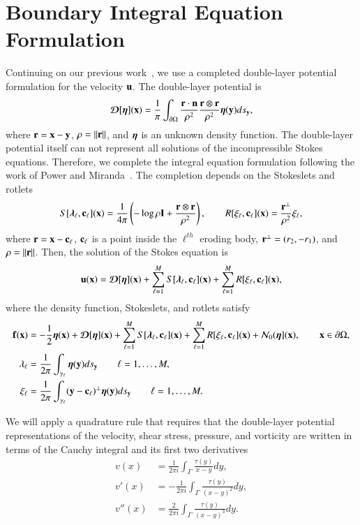 \documentclass[preprint, 10pt]{elsarticle}
\begin{document}
\section{Boundary Integral Equation Formulation}
\label{s:formulation}
Continuing on our previous work~\cite{qua-moo2018}, we use a completed
double-layer potential formulation for the velocity ${\mathbf{u}}$.  The
double-layer potential is
\begin{align}
  {\boldsymbol{\mathcal D}}[{\boldsymbol\eta}]({\mathbf{x}}) = \frac{1}{\pi}\int_{{\partial}\Omega} 
    \frac{{\mathbf{r}} \cdot {\mathbf{n}}}{\rho^2} \frac{{\mathbf{r}} \otimes {\mathbf{r}}}{\rho^2}
    {\boldsymbol\eta}({\mathbf{y}}) ds_{\mathbf{y}},
\end{align}
where ${\mathbf{r}} = {\mathbf{x}} - {\mathbf{y}}$, $\rho = \|{\mathbf{r}}\|$, and ${\boldsymbol\eta}$ is an unknown
density function.  The double-layer potential itself can not represent
all solutions of the incompressible Stokes equations.  Therefore, we
complete the integral equation formulation following the work of Power
and Miranda~\cite{pow-mir1987}.  The completion depends on the
Stokeslets and rotlets
\begin{align}
  S[{\boldsymbol\lambda}_\ell,{\mathbf{c}}_\ell]({\mathbf{x}}) = \frac{1}{4\pi} \left( 
    -\log \rho {\mathbf{I}} + \frac{{\mathbf{r}} \otimes {\mathbf{r}}}{\rho^2} \right), \qquad
  R[\xi_\ell,{\mathbf{c}}_\ell]({\mathbf{x}}) = \frac{{\mathbf{r}}^\perp}{\rho^2} \xi_\ell,
\end{align}
where ${\mathbf{r}} = {\mathbf{x}} - {\mathbf{c}}_\ell$, ${\mathbf{c}}_\ell$ is a point inside the
$\ell^{th}$ eroding body, ${\mathbf{r}}^\perp = (r_2,-r_1)$, and $\rho =
\|{\mathbf{r}}\|$.  Then, the solution of the Stokes equation is
\begin{align}
  {\mathbf{u}}({\mathbf{x}}) = {\boldsymbol{\mathcal D}}[{\boldsymbol\eta}]({\mathbf{x}}) + 
    \sum_{\ell=1}^M S[{\boldsymbol\lambda}_\ell,{\mathbf{c}}_\ell]({\mathbf{x}}) + 
    \sum_{\ell=1}^M R[\xi_\ell,{\mathbf{c}}_\ell]({\mathbf{x}}),
\end{align}
where the density function, Stokeslets, and rotlets satisfy
\begin{align}
  {\mathbf{f}}({\mathbf{x}}) &= -\frac{1}{2}{\boldsymbol\eta}({\mathbf{x}}) + {\boldsymbol{\mathcal D}}[{\boldsymbol\eta}]({\mathbf{x}}) + 
    \sum_{\ell=1}^M S[{\boldsymbol\lambda}_\ell,{\mathbf{c}}_\ell]({\mathbf{x}}) + 
    \sum_{\ell=1}^M R[\xi_\ell,{\mathbf{c}}_\ell]({\mathbf{x}}) +
    {\mathcal{N}}_0({\boldsymbol\eta}]({\mathbf{x}}), \qquad {\mathbf{x}} \in {\partial}\Omega, \\
  \lambda_\ell &= \frac{1}{2\pi} \int_{\gamma_\ell} 
    {\boldsymbol\eta}({\mathbf{y}}) ds_{\mathbf{y}} \qquad \ell = 1,\ldots,M, \\
  \xi_\ell &= \frac{1}{2\pi} \int_{\gamma_\ell}
    ({\mathbf{y}} - {\mathbf{c}}_\ell)^\perp  {\boldsymbol\eta}({\mathbf{y}}) ds_{\mathbf{y}} 
    \qquad \ell = 1,\ldots,M.
\end{align}

We will apply a quadrature rule that requires that the double-layer
potential representations of the velocity, shear stress, pressure, and
vorticity are written in terms of the Cauchy integral and its first two
derivatives
\begin{align}
  \label{eqn:Cauchy}
  v(x) &= \frac{1}{2\pi i} \int_\Gamma 
    \frac{\tau(y)}{x - y} dy, \\
  v'(x) &= -\frac{1}{2\pi i} \int_\Gamma 
    \frac{\tau(y)}{(x - y)^2} dy, \\
  v''(x) &= \frac{2}{2\pi i} \int_\Gamma 
    \frac{\tau(y)}{(x - y)^3} dy.
\end{align}
\end{document}
